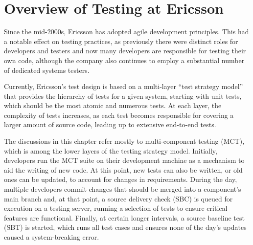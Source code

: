 \section{Overview of Testing at Ericsson}\label{sec:ind_overview}

%

%
%

Since the mid-2000s, Ericsson has adopted agile development principles.
This had a notable effect on testing practices, as previously there were distinct roles for developers and testers and now many developers are responsible for testing their own code, although the company also continues to employ a substantial number of dedicated systems testers.

Currently, Ericsson's test design is based on a multi-layer ``test strategy model'' that provides the hierarchy of tests for a given system, starting with unit tests, which should be the most atomic and numerous tests.
At each layer, the complexity of tests increases, as each test becomes responsible for covering a larger amount of source code, leading up to extensive end-to-end tests.

The discussions in this chapter refer mostly to multi-component testing (MCT), which is among the lower layers of the testing strategy model.
Initially, developers run the MCT suite on their development machine as a mechanism to aid the writing of new code.
At this point, new tests can also be written, or old ones can be updated, to account for changes in requirements.
During the day, multiple developers commit changes that should be merged into a component's main branch and, at that point, a source delivery check (SBC) is queued for execution on a testing server, running a selection of tests to ensure critical features are functional.
Finally, at certain longer intervals, a source baseline test (SBT) is started, which runs all test cases and ensures none of the day's updates caused a system-breaking error.

